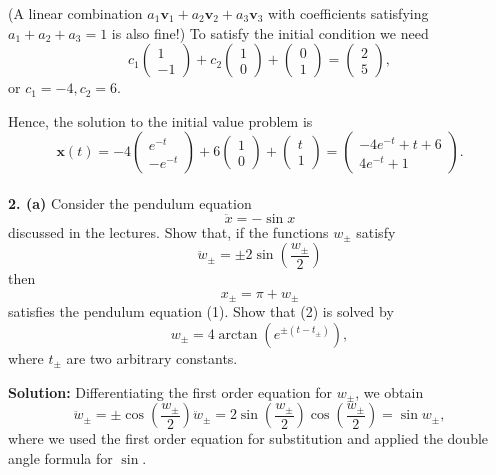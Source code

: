 \documentclass[10pt,landscape]{article}
\begin{document}
\begin{multicols}{2}
(A linear combination \( a_1\mathbf{v}_1 + a_2\mathbf{v}_2 + a_3\mathbf{v}_3 \) with coefficients satisfying \( a_1 + a_2 + a_3 = 1 \) is also fine!) To satisfy the initial condition we need\\
\[
c_1
\begin{pmatrix}
1 \\
-1
\end{pmatrix} + c_2
\begin{pmatrix}
1 \\
0
\end{pmatrix} +
\begin{pmatrix}
0 \\
1
\end{pmatrix} =
\begin{pmatrix}
2 \\
5
\end{pmatrix},
\]
 or \( c_1 = -4, c_2 = 6 \). 

Hence, the solution to the initial value problem is\\
\[
\mathbf{x}(t) = -4
\begin{pmatrix}
e^{-t} \\
-e^{-t}
\end{pmatrix} + 6
\begin{pmatrix}
1 \\
0
\end{pmatrix} +
\begin{pmatrix}
t \\
1
\end{pmatrix}
=
\begin{pmatrix}
-4e^{-t} + t + 6 \\
4e^{-t} + 1
\end{pmatrix}.
\]\\


\bigskip
\bigskip
\textbf{2. (a)}  Consider the pendulum equation\\
\[
\ddot{x} = -\sin x \tag{1}
\]
discussed in the lectures. Show that, if the functions \( w_{\pm} \) satisfy\\
\[
\ddot{w}_{\pm} = \pm 2 \sin \left( \frac{w_{\pm}}{2} \right) \tag{2}
\]
then\\
\[
x_{\pm} = \pi + w_{\pm}
\]
satisfies the pendulum equation (1). Show that (2) is solved by\\
\[
w_{\pm} = 4 \arctan \left( e^{\pm(t - t_{\pm})} \right),
\]
where \( t_{\pm} \) are two arbitrary constants.

\textbf{Solution:} Differentiating the first order equation for \( w_{\pm} \), we obtain\\
\[
\ddot{w}_{\pm} = \pm \cos \left( \frac{w_{\pm}}{2} \right) \ddot{w}_{\pm} = 2 \sin \left( \frac{w_{\pm}}{2} \right) \cos \left( \frac{w_{\pm}}{2} \right) = \sin w_{\pm},
\]
where we used the first order equation for substitution and applied the double angle formula for \( \sin \). 


\end{multicols}
\end{document}
